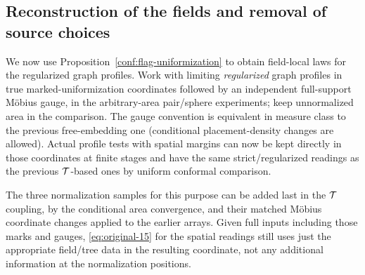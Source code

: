 \subsection{Reconstruction of the fields and removal of source choices}
\label{conf:source-setup}

We now use Proposition~\ref{conf:flag-uniformization} to obtain field-local laws for the regularized
graph profiles. Work with limiting \emph{regularized} graph profiles in true marked-uniformization
coordinates followed by an independent full-support Möbius gauge, in the arbitrary-area pair/sphere
experiments; keep unnormalized area in the comparison. The gauge convention is equivalent in measure
class to the previous free-embedding one (conditional placement-density changes are allowed). Actual
profile tests with spatial margins can now be kept directly in those coordinates at finite stages
and have the same strict/regularized readings as the previous \({\cal T}\)-based ones by uniform
conformal comparison.

The three normalization samples for this purpose can be added last in the \({\cal T}\) coupling, by
the conditional area convergence, and their matched Möbius coordinate changes applied to the earlier
arrays. Given full inputs including those marks and gauges, \eqref{eq:original-15} for the spatial
readings still uses just the appropriate field/tree data in the resulting coordinate, not any
additional information at the normalization positions.

